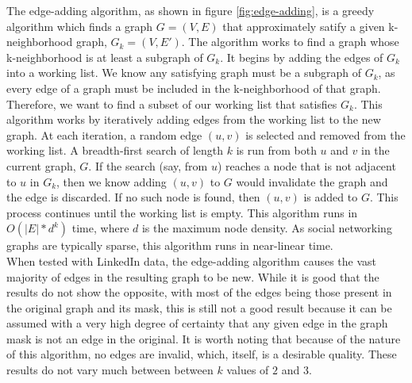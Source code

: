 %

\indent The edge-adding algorithm, as shown in figure \ref{fig:edge-adding}, is a greedy algorithm which finds a graph $G = (V,E)$ that approximately satify a given k-neighborhood graph, $G_k = (V, E')$. The algorithm works to find a graph whose k-neighborhood is at least a subgraph of $G_k$. It begins by adding the edges of $G_k$ into a working list. We know any satisfying graph must be a subgraph of $G_k$, as every edge of a graph must be included in the k-neighborhood of that graph. Therefore, we want to find a subset of our working list that satisfies $G_k$. This algorithm works by iteratively adding edges from the working list to the new graph.  At each iteration, a random edge $(u,v)$ is selected and removed from the working list. A breadth-first search of length $k$ is run from both $u$ and $v$ in the current graph, $G$. If the search (say, from $u$) reaches a node that is not adjacent to $u$ in $G_k$, then we know adding $(u,v)$ to $G$ would invalidate the graph and the edge is discarded. If no such node is found, then $(u,v)$ is added to $G$. This process continues until the working list is empty. This algorithm runs in $O(|E|*d^k)$ time, where $d$ is the maximum node density. As social networking graphs are typically sparse, this algorithm runs in near-linear time. \\

\indent When tested with LinkedIn data, the edge-adding algorithm causes the vast majority of edges in the resulting graph to be new. While it is good that the results do not show the opposite, with most of the edges being those present in the original graph and its mask, this is still not a good result because it can be assumed with a very high degree of certainty that any given edge in the graph mask is not an edge in the original. It is worth noting that because of the nature of this algorithm, no edges are invalid, which, itself, is a desirable quality. These results do not vary much between between $k$ values of $2$ and $3$. \\
